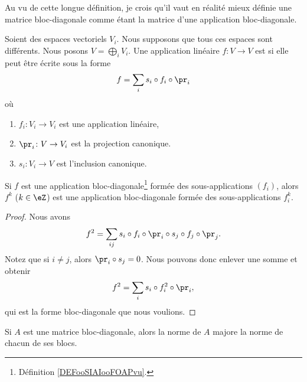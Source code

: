 \begin{normaltext}
	Au vu de cette longue définition, je crois qu'il vaut en réalité mieux définie une matrice bloc-diagonale comme étant la matrice d'une application bloc-diagonale.
\end{normaltext}

\begin{definition}	\label{DEFooSIAIooFOAPvu}
	Soient des espaces vectoriels \( V_i\). Nous supposons que tous ces espaces sont différents. Nous posons \( V=\bigoplus_iV_i\). Une application linéaire \(f \colon V\to V  \) est  si elle peut être écrite sous la forme
	\begin{equation}
		f=\sum_is_i\circ f_i\circ \pr_i
	\end{equation}
	où
	\begin{enumerate}
		\item
		      \(f_i \colon V_i\to V_i  \) est une application linéaire,
		\item
		      \(\pr_i \colon V\to V_i  \) est la projection canonique.
		\item
		      \(s_i \colon V_i\to V  \) est l'inclusion canonique.
	\end{enumerate}
\end{definition}


\begin{lemma}       \label{LEMooHGCKooBzfAtg}
	Si \( f\) est une application bloc-diagonale\footnote{Définition \ref{DEFooSIAIooFOAPvu}.} formée des sous-applications \( (f_i)\), alors \( f^k\) (\( k\in \eZ\)) est une application bloc-diagonale formée des sous-applications \( f_i^k\).
\end{lemma}

\begin{proof}
	Nous avons
	\begin{equation}
		f^2=\sum_{ij}s_i\circ f_i\circ \pr_i\circ s_j\circ f_j\circ \pr_j.
	\end{equation}
	Notez que si \( i\neq j\), alors \( \pr_i\circ s_j=0\). Nous pouvons donc enlever une somme et obtenir
	\begin{equation}
		f^2=\sum_is_i\circ f_i^2\circ\pr_i,
	\end{equation}
	qui est la forme bloc-diagonale que nous voulions.
\end{proof}

\begin{proposition}      \label{PROPooJUYCooHnlFef}
	Si \( A\) est une matrice bloc-diagonale, alors la norme de \( A\) majore la norme de chacun de ses blocs.
\end{proposition}

